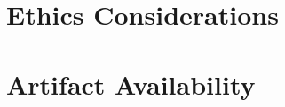 \documentclass[sigconf,anonymous,review]{acmart}
\theoremstyle{definition}
\begin{document}
\appendix


\section*{Ethics Considerations}


\section*{Artifact Availability}

\end{document}
